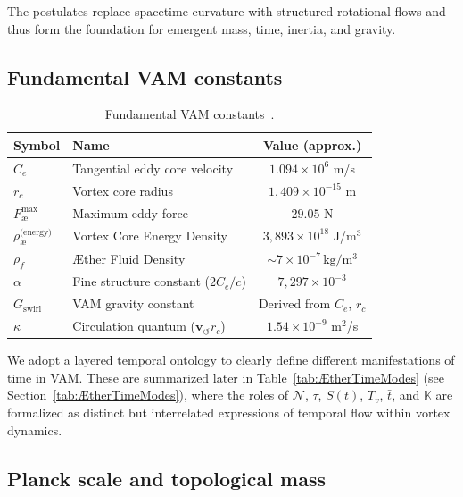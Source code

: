 The postulates replace spacetime curvature with structured rotational flows and thus form the foundation for emergent mass, time, inertia, and gravity.

\subsection*{Fundamental VAM constants}

\begin{table}[htbp]
    \centering
    \begin{tabular}{llc}
        \hline
        \toprule
        \textbf{Symbol} & \textbf{Name} & \textbf{Value (approx.)} \\
        \hline
        \midrule
        $C_e$ & Tangential eddy core velocity & $1.094 \times 10^6$ m/s \\
        $r_c$ & Vortex core radius & $1,409 \times 10^{-15}$ m \\
        $F^{\text{max}}_{\text{\ae}}$ & Maximum eddy force & $29.05$ N \\
        $\rho_\text{\ae}^\text{(energy)}$ & Vortex Core Energy Density & $3,893 \times 10^{18}$ J/m$^3$ \\
        $\rho_{\scriptscriptstyle\boldsymbol\!f}$ &  Æther Fluid Density & $\sim 7 \times 10^{-7}\, \mathrm{kg/m^3}$ \\
        $\alpha$ & Fine structure constant ($2 C_e/c$) & $7,297 \times 10^{-3}$\\
        $G_\text{swirl}$ & VAM gravity constant & Derived from $C_e$, $r_c$\\
        $\kappa$ & Circulation quantum ($\mathbf{v}_{\scriptscriptstyle\boldsymbol{\circlearrowleft}} r_c$) & $1.54 \times 10^{-9}$ m$^2$/s \\
        \hline
        \bottomrule
    \end{tabular}
    \caption{Fundamental VAM constants~\cite{vam2025field}.}
    \label{tab:VAMconstants}
\end{table}

We adopt a layered temporal ontology to clearly define different manifestations of time in VAM. These are summarized later in Table~\ref{tab:ÆtherTimeModes} (see Section~\ref{tab:ÆtherTimeModes}), where the roles of $\mathcal{N}$, $\tau$, $S(t)$, $T_v$, $\bar{t}$, and $\mathbb{K}$ are formalized as distinct but interrelated expressions of temporal flow within vortex dynamics.


\subsection*{Planck scale and topological mass}

